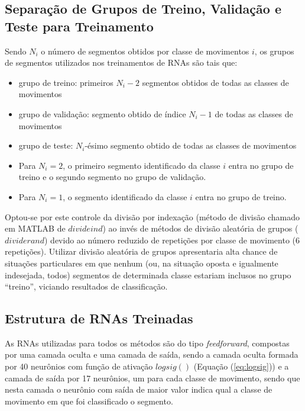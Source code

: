 			\subsection{Separação de Grupos de Treino, Validação e Teste para Treinamento}
Sendo $N_i$ o número de segmentos obtidos por classe de movimentos $i$, os grupos de segmentos utilizados nos treinamentos de RNAs são tais que: 

\begin{itemize}
\item grupo de treino: primeiros $N_i-2$ segmentos obtidos de todas as classes de movimentos
\item grupo de validação: segmento obtido de índice $N_i-1$ de todas as classes de movimentos
\item grupo de teste: $N_i$-ésimo segmento obtido de todas as classes de movimentos
\item Para $N_i=2$, o primeiro segmento identificado da classe $i$ entra no grupo de treino e o segundo segmento no grupo de validação.
\item Para $N_i=1$, o segmento identificado da classe $i$ entra no grupo de treino.
\end{itemize}

Optou-se por este controle da divisão por indexação (método de divisão chamado em MATLAB de $divideind$) ao invés de métodos de divisão aleatória de grupos ($dividerand$) devido ao número reduzido de repetições por classe de movimento (6 repetições). Utilizar divisão aleatória de grupos apresentaria alta chance de situações particulares em que nenhum (ou, na situação oposta e igualmente indesejada, todos) segmentos de determinada classe estariam inclusos no grupo ``treino'', viciando resultados de classificação.

			\subsection{Estrutura de RNAs Treinadas}
As RNAs utilizadas para todos os métodos são do tipo \emph{feedforward}, compostas por uma camada oculta e uma camada de saída, sendo a camada oculta formada por 40 neurônios com função de ativação $logsig()$ (Equação (\ref{eq:logsig})) e a camada de saída por 17 neurônios, um para cada classe de movimento, sendo que nesta camada o neurônio com saída de maior valor indica qual a classe de movimento em que foi classificado o segmento.

